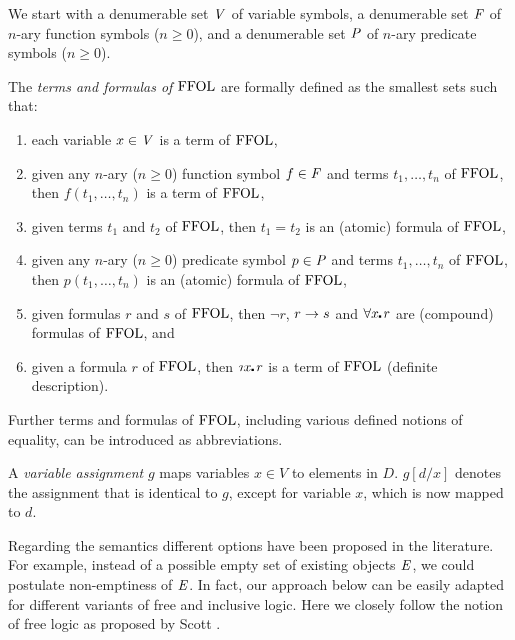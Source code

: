 \begin{definition}
  We start with a denumerable set $\V$ of variable symbols, a denumerable set
  $\F$ of $n$-ary function symbols ($n\geq 0$), and a denumerable set
  $\P$ of $n$-ary predicate symbols ($n\geq 0$).

  The \emph{terms and formulas of $\FFOL$} are formally defined as the
  smallest sets such that:
\begin{enumerate}
\item each variable $x\in\V$ is a term of $\FFOL$, 
\item given any $n$-ary ($n\geq 0$) function symbol $f\in\F$ and terms
  $t_1,\ldots,t_n$ of $\FFOL$, then $f(t_1,\ldots,t_n)$ is a term of $\FFOL$, 
\item given terms $t_1$ and $t_2$ of $\FFOL$, then $t_1 = t_2$ is an
  (atomic) formula of $\FFOL$,
\item given any $n$-ary ($n\geq 0$) predicate symbol $p\in\P$ and terms
$t_1,\ldots,t_n$ of $\FFOL$, then $p(t_1,\ldots,t_n)$ is an (atomic)
formula of $\FFOL$, 
\item given formulas $r$ and $s$ of $\FFOL$, then $\neg r$, $r
  \Impl s$ and $\forall x\lambdot r$ are (compound) formulas of
  $\FFOL$, and
\item given a formula $r$ of $\FFOL$, then $\Descr x\lambdot r$ is a
  term of $\FFOL$ (definite  description).
\end{enumerate}
\end{definition}

Further terms and formulas of $\FFOL$, including various defined notions of
equality, can be introduced as abbreviations. 


A \emph{variable assignment} $g$ maps
variables $x\in V$ to elements in $D$. $g[d/x]$ denotes the
assignment that is identical to $g$, except for variable $x$, which is
now mapped to $d$.

Regarding the semantics different options have been proposed in the literature. For
example, instead of a possible empty set of existing objects $\ex$, we
could postulate non-emptiness of $\ex$. 
In fact, our approach below can be easily adapted for different variants of free and
inclusive logic.
Here we closely
follow the notion of free logic as proposed by Scott \cite{Scott67}.



